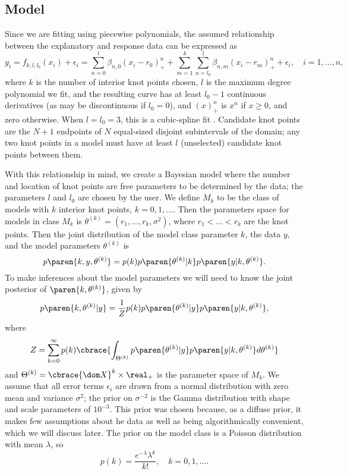 \documentclass[12pt]{article}
\newcommand{\thetak}{\theta^{(k)}}
\newcommand{\Thetak}{\Theta^{(k)}}
\begin{document}
\subsection{Model}

Since we are fitting using piecewise polynomials, the assumed
relationship between the explanatory and response data can be
expressed as
\begin{equation*}
  \label{modeleq}
  y_i = f_{k, l, l_0}(x_i) + \epsilon_i = \sum_{n = 0}^l \beta_{n, 0}
  (x_i - r_0)^n_+ + \sum_{m = 1}^k \sum_{n = l_0}^l \beta_{n, m} (x_i
  - r_m)^n_+ + \epsilon_i, \quad i = 1, \ldots, n,
\end{equation*}
where $k$ is the number of interior knot points chosen, $l$ is the
maximum degree polynomial we fit, and the resulting curve has at least
$l_0 - 1$ continuous derivatives (as may be discontinuous if $l_0 =
0$), and $(x)_+^n$ is $x^n$ if $x \ge 0$, and zero otherwise. When $l
= l_0 = 3$, this is a cubic-spline fit
\cite{denison1998automatic}. Candidate knot points are the $N + 1$
endpoints of $N$ equal-sized disjoint subintervals of the domain; any
two knot points in a model must have at least $l$ (unselected)
candidate knot points between them.

With this relationship in mind, we create a Bayesian model where the
number and location of knot points are free parameters to be
determined by the data; the parameters $l$ and $l_0$ are chosen by the
user. We define $M_k$ to be the class of models with $k$ interior knot
points, $k = 0, 1, \ldots$. Then the parameters space for models in class
$M_k$ is $\thetak = (r_1, \ldots, r_k, \sigma^2)$, where $r_1 <
\ldots < r_k$ are the knot points. Then the joint distribution of the
model class parameter $k$, the data $y$, and the model parameters
$\thetak$ is
\begin{equation*}
  p\paren{k, y, \thetak} = p(k) p\paren{\thetak | k}
  p\paren{y | k, \thetak}.
\end{equation*}
To make inferences about the model parameters we will need to know the
joint posterior of $\paren{k, \thetak}$, given by
\begin{equation*}
  p\paren{k, \theta^{(k)} | y} = \frac{1}{Z} p(k) p\paren{\thetak | y}
  p\paren{y | k, \thetak},
\end{equation*}
where
\begin{equation*}
  Z = \sum_{k = 0}^\infty p(k) \cbrace{\int_{\Thetak} p\paren{\thetak
      | y} p\paren{y | k, \thetak} d \thetak}
\end{equation*}
and $\Thetak = \cbrace{\dom X}^k \times \real_+$ is the parameter
space of $M_k$. We assume that all error terms $\epsilon_i$ are drawn
from a normal distribution with zero mean and variance $\sigma^2$; the
prior on $\sigma^{-2}$ is the Gamma distribution with shape and scale
parameters of $10^{-3}$. This prior was chosen because, as a diffuse
prior, it makes few assumptions about he data as well as being
algorithmically convenient, which we will discuss later. The prior on
the model class is a Poisson distribution with mean $\lambda$, so
\begin{equation*}
  p(k) = \frac{e^{-\lambda} \lambda^k}{k!}, \quad k = 0, 1, \ldots.
\end{equation*}
\end{document}
